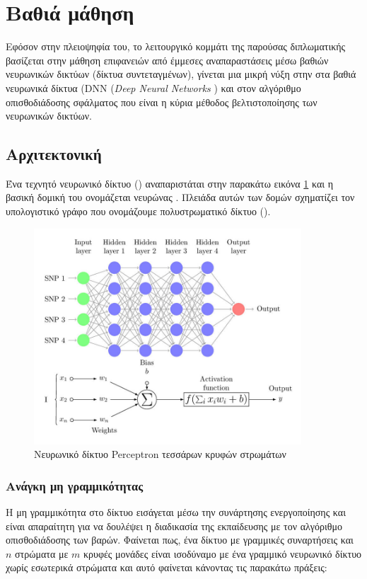 \section{Βαθιά μάθηση}
\label{section:dnnTheory}
Εφόσον στην πλειοψηφία του, το λειτουργικό κομμάτι της παρούσας διπλωματικής βασίζεται στην μάθηση επιφανειών από έμμεσες αναπαραστάσεις μέσω βαθιών νευρωνικών δικτύων (δίκτυα συντεταγμένων), γίνεται μια μικρή νύξη στην στα βαθιά νευρωνικά δίκτυα (DNN (\textit{Deep Neural Networks }) και στον αλγόριθμο οπισθοδιάδοσης σφάλματος που είναι η κύρια μέθοδος βελτιστοποίησης των νευρωνικών δικτύων.

\subsection{Αρχιτεκτονική}
Ένα τεχνητό νευρωνικό δίκτυο () αναπαριστάται στην παρακάτω εικόνα \ref{fig:2} και η βασική δομική του ονομάζεται νευρώνας . Πλειάδα αυτών των δομών σχηματίζει τον υπολογιστικό γράφο που ονομάζουμε πολυστρωματικό δίκτυο  ().\\
\begin{figure}[ht]
\centering
\includegraphics[width=10cm]{images/chapter2_img/Multi-Layer-Perceptron-MLP-diagram-with-four-hidden-layers-and-a-collection-of-single.jpg}
\caption{Νευρωνικό δίκτυο Perceptron τεσσάρων κρυφών στρωμάτων}
\label{fig:2}
\end{figure} 
\newline

\subsubsection{Ανάγκη μη γραμμικότητας}
Η μη γραμμικότητα στο δίκτυο εισάγεται μέσω την συνάρτησης ενεργοποίησης και είναι απαραίτητη για να δουλέψει η διαδικασία της εκπαίδευσης  με τον αλγόριθμο οπισθοδιάδοσης των βαρών.  Φαίνεται πως, ένα δίκτυο με γραμμικές συναρτήσεις και \(n\) στρώματα με \(m\) κρυφές μονάδες είναι ισοδύναμο με ένα γραμμικό νευρωνικό δίκτυο χωρίς εσωτερικά στρώματα και αυτό φαίνεται κάνοντας τις παρακάτω πράξεις:


